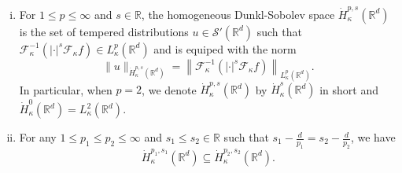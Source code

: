 \documentclass[a4paper,11pt, reqno]{amsart}
\theoremstyle{definition}
\theoremstyle{remark}
\numberwithin{equation}{section}
\begin{document}
\begin{enumerate}[(i)]
		\item For $1\leq p\leq \infty$ and $s\in\mathbb{R}$, the homogeneous Dunkl-Sobolev space $\dot{H}_\kappa^{p,s}\left(\mathbb{R}^{d}\right)$ is the set of tempered distributions $u \in \mathcal{S}'\left(\mathbb{R}^{d}\right)$ such that $\mathcal{F}^{-1}_\kappa\left(|\cdot|^s \mathcal{F}_\kappa f\right)\in L_\kappa^p\left(\mathbb{R}^{d}\right)$ and is equiped with the norm 
		\begin{equation*}
			\|u\|_{\dot{H}_\kappa^{p,s}\left(\mathbb{R}^{d}\right)}=\left\|\mathcal{F}^{-1}_\kappa\left(|\cdot|^s \mathcal{F}_\kappa f\right)\right\|_{L_\kappa^p\left(\mathbb{R}^{d}\right)}.
		\end{equation*}
		In particular, when $p=2$, we denote $\dot{H}_\kappa^{p,s}\left(\mathbb{R}^{d}\right)$ by $\dot{H}_\kappa^{s}\left(\mathbb{R}^{d}\right)$ in short and $\dot{H}_\kappa^{0}\left(\mathbb{R}^{d}\right)=L_\kappa^2\left(\mathbb{R}^{d}\right)$.\\
	\item 	For any $1\leq p_1\leq p_2\leq\infty$ and $s_1\leq s_2 \in\mathbb{R}$ such that $s_1-\frac{d}{p_1}=s_2-\frac{d}{p_2}$, we have
		\begin{equation}\label{Sobolev-Embedding}
			\dot{H}_\kappa^{p_1,s_1} (\mathbb{R}^{d})\subseteq \dot{H}_\kappa^{p_2,s_2} (\mathbb{R}^{d}).
		\end{equation}
\end{enumerate}
\end{document}
